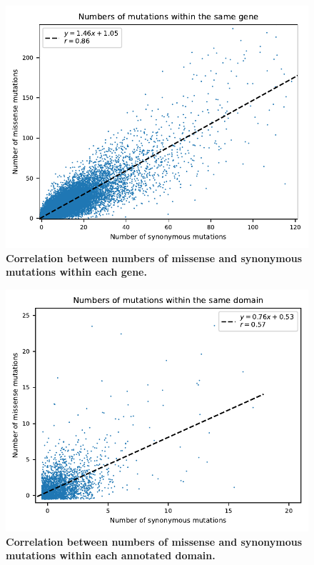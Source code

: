 \documentclass[]{article}
\begin{document}
\begin{figure}[ht!]
    \centering
    \includegraphics{../figures/mutations_in_genes}
    \caption{
        \textbf{Correlation between numbers of missense and synonymous mutations
        within each gene.}
    }
    \label{fig:mutCorrGene}
\end{figure}

\begin{figure}[ht!]
    \centering
    \includegraphics{../figures/mutations_in_domains}
    \caption{
        \textbf{Correlation between numbers of missense and synonymous mutations
        within each annotated domain.}
    }
    \label{fig:mutCorrDomain}
\end{figure}
\end{document}
